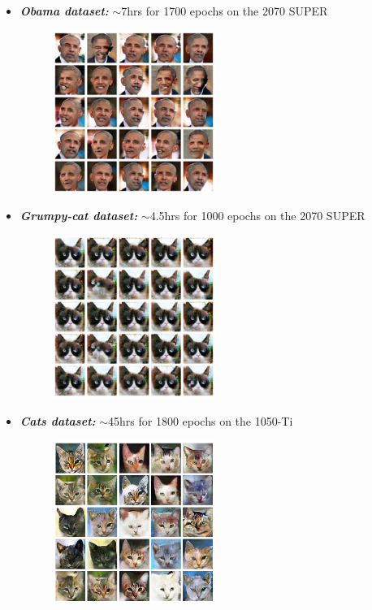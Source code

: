 \documentclass[12pt]{article}
\begin{document}
\begin{itemize}
{\begin{figure}[H]
		\end{figure}
	}
	\item {
		\textbf{\textit{Obama dataset:}} $\sim$7hrs for 1700 epochs on the 2070 SUPER
		\begin{figure}[H]
			\centering
			\includegraphics[width=0.5\textwidth]{Images/obama_exp.jpg}
		\end{figure}
	}
	\item {
		\textbf{\textit{Grumpy-cat dataset:}} $\sim$4.5hrs for 1000 epochs on the 2070 SUPER
		\begin{figure}[H]
			\centering
			\includegraphics[width=0.5\textwidth]{Images/grumpy_exp.jpg}
		\end{figure}
	}
	\vspace*{4cm}
	\item {
		\textbf{\textit{Cats dataset:}} $\sim$45hrs for 1800 epochs on the 1050-Ti
		\begin{figure}[H]
			\centering
			\includegraphics[width=0.5\textwidth]{Images/cats_exp.png}
		\end{figure}
	}
\end{itemize} 
\end{document}
